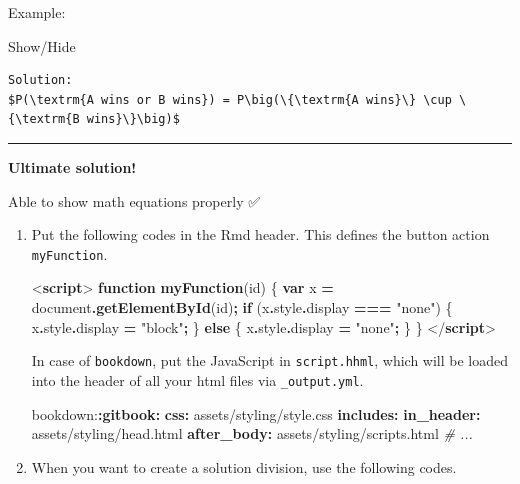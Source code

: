 \documentclass[
  a4paper,
  twoside,
  openright]{book}
\newenvironment{Shaded}{\begin{snugshade}}{\end{snugshade}}
\newcommand{\AttributeTok}[1]{\textcolor[rgb]{0.13,0.29,0.53}{#1}}
\newcommand{\BuiltInTok}[1]{#1}
\newcommand{\CommentTok}[1]{\textcolor[rgb]{0.56,0.35,0.01}{\textit{#1}}}
\newcommand{\ControlFlowTok}[1]{\textcolor[rgb]{0.13,0.29,0.53}{\textbf{#1}}}
\newcommand{\DataTypeTok}[1]{\textcolor[rgb]{0.13,0.29,0.53}{#1}}
\newcommand{\FunctionTok}[1]{\textcolor[rgb]{0.13,0.29,0.53}{\textbf{#1}}}
\newcommand{\KeywordTok}[1]{\textcolor[rgb]{0.13,0.29,0.53}{\textbf{#1}}}
\newcommand{\NormalTok}[1]{#1}
\newcommand{\OperatorTok}[1]{\textcolor[rgb]{0.81,0.36,0.00}{\textbf{#1}}}
\newcommand{\StringTok}[1]{\textcolor[rgb]{0.31,0.60,0.02}{#1}}
\theoremstyle{definition}
\theoremstyle{definition}
\theoremstyle{definition}
\theoremstyle{definition}
\theoremstyle{remark}
\begin{document}
Example:

Show/Hide

\label{target2}
\begin{verbatim}
Solution:
$P(\textrm{A wins or B wins}) = P\big(\{\textrm{A wins}\} \cup \{\textrm{B wins}\}\big)$
\end{verbatim}

\begin{center}\rule{0.5\linewidth}{0.5pt}\end{center}

{\textbf{Ultimate solution!} }

Able to show math equations properly ✅

\begin{enumerate}
\def\labelenumi{\arabic{enumi}.}
\item
  Put the following codes in the Rmd {header}. This defines the button action \texttt{myFunction}.

\begin{Shaded}
\begin{Highlighting}[]
\DataTypeTok{\textless{}}\KeywordTok{script}\DataTypeTok{\textgreater{}} 
    \KeywordTok{function} \FunctionTok{myFunction}\NormalTok{(id) \{}
      \KeywordTok{var}\NormalTok{ x }\OperatorTok{=} \BuiltInTok{document}\OperatorTok{.}\FunctionTok{getElementById}\NormalTok{(id)}\OperatorTok{;} 
      \ControlFlowTok{if}\NormalTok{ (x}\OperatorTok{.}\AttributeTok{style}\OperatorTok{.}\AttributeTok{display} \OperatorTok{===} \StringTok{"none"}\NormalTok{) \{}
\NormalTok{        x}\OperatorTok{.}\AttributeTok{style}\OperatorTok{.}\AttributeTok{display} \OperatorTok{=} \StringTok{"block"}\OperatorTok{;}
\NormalTok{      \} }\ControlFlowTok{else}\NormalTok{ \{}
\NormalTok{        x}\OperatorTok{.}\AttributeTok{style}\OperatorTok{.}\AttributeTok{display} \OperatorTok{=} \StringTok{"none"}\OperatorTok{;}
\NormalTok{      \}}
\NormalTok{    \}}
\DataTypeTok{\textless{}/}\KeywordTok{script}\DataTypeTok{\textgreater{}}
\end{Highlighting}
\end{Shaded}

  In case of \texttt{bookdown}, put the JavaScript in \texttt{script.hhml}, which will be loaded into the header of all your html files via \texttt{\_output.yml}.

\begin{Shaded}
\begin{Highlighting}[]
\AttributeTok{bookdown:}\FunctionTok{:gitbook}\KeywordTok{:}
\AttributeTok{  }\FunctionTok{css}\KeywordTok{:}\AttributeTok{ assets/styling/style.css}
\AttributeTok{  }\FunctionTok{includes}\KeywordTok{:}
\AttributeTok{    }\FunctionTok{in\_header}\KeywordTok{:}\AttributeTok{ assets/styling/head.html}
\AttributeTok{    }\FunctionTok{after\_body}\KeywordTok{:}\AttributeTok{ assets/styling/scripts.html}
\CommentTok{  \# ...}
\end{Highlighting}
\end{Shaded}
\item
  When you want to create a solution division, use the following codes.


\end{enumerate}
\end{document}
